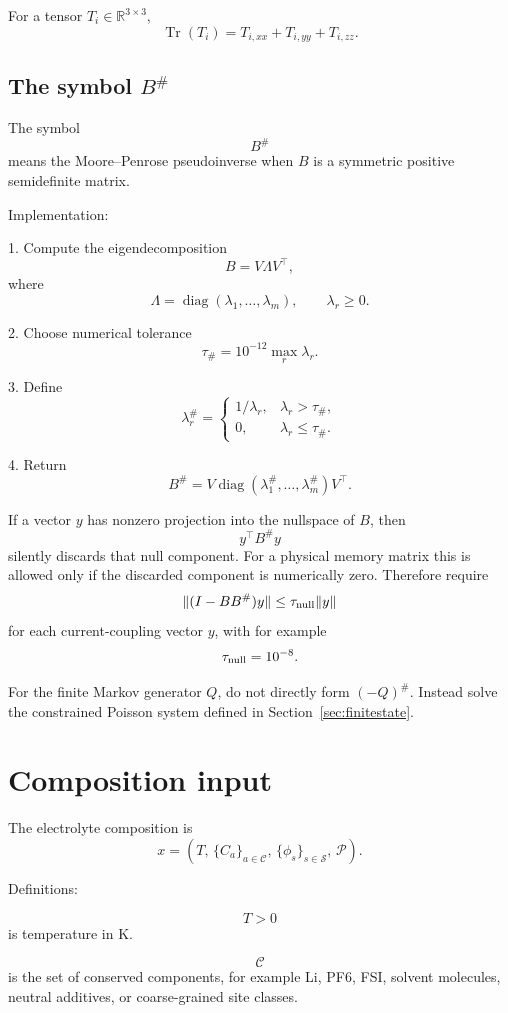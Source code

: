 \documentclass[11pt]{article}
\newcommand{\R}{\mathbb R}
\newcommand{\Tr}{\operatorname{Tr}}
\newcommand{\diag}{\operatorname{diag}}
\begin{document}
For a tensor \(T_i\in\R^{3\times3}\),
\[
\Tr(T_i)=T_{i,xx}+T_{i,yy}+T_{i,zz}.
\]

\subsection{The symbol \(B^\#\)}

The symbol
\[
B^\#
\]
means the Moore--Penrose pseudoinverse when \(B\) is a symmetric positive
semidefinite matrix.

Implementation:

1. Compute the eigendecomposition
\[
B=V\Lambda V^\top,
\]
where
\[
\Lambda=\diag(\lambda_1,\ldots,\lambda_m),
\qquad
\lambda_r\ge0.
\]

2. Choose numerical tolerance
\[
\tau_{\#}=10^{-12}\max_r \lambda_r.
\]

3. Define
\[
\lambda_r^\#=
\begin{cases}
1/\lambda_r, & \lambda_r>\tau_{\#},\\
0, & \lambda_r\le\tau_{\#}.
\end{cases}
\]

4. Return
\[
B^\#=V\diag(\lambda_1^\#,\ldots,\lambda_m^\#)V^\top.
\]

If a vector \(y\) has nonzero projection into the nullspace of \(B\), then
\[
y^\top B^\# y
\]
silently discards that null component. For a physical memory matrix this is
allowed only if the discarded component is numerically zero. Therefore require
\[
\|(I-BB^\#)y\| \le \tau_{\rm null}\|y\|
\]
for each current-coupling vector \(y\), with for example
\[
\tau_{\rm null}=10^{-8}.
\]

For the finite Markov generator \(Q\), do not directly form \((-Q)^\#\).
Instead solve the constrained Poisson system defined in Section~\ref{sec:finitestate}.

\section{Composition input}
\label{sec:compinput}

The electrolyte composition is
\[
x=
\left(
T,\,
\{C_a\}_{a\in\mathcal C},\,
\{\phi_s\}_{s\in\mathcal S},\,
\mathcal P
\right).
\]

Definitions:

\[
T>0
\]
is temperature in K.

\[
\mathcal C
\]
is the set of conserved components, for example Li, PF6, FSI, solvent molecules,
neutral additives, or coarse-grained site classes.
\end{document}

